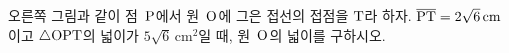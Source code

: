 \noindent\begin{minipage}[t]{0.58\linewidth}\vspace{0pt}\raggedright 오른쪽 그림과 같이 점~$\mathrm{P}$에서 원~$\mathrm{O}$에 그은 접선의 접점을 $\mathrm{T}$라 하자. $\overline{\mathrm{PT}}=2\sqrt{6}\,\mathrm{cm}$이고 $\triangle\mathrm{OPT}$의 넓이가 $5\sqrt{6}\,\mathrm{cm}^2$일 때, 원~$\mathrm{O}$의 넓이를 구하시오.\end{minipage}\hfill\begin{minipage}[t]{0.4\linewidth}\vspace{0pt}\centering \resizebox{\ifdim\width>\linewidth\linewidth\else\width\fi}{!}{}\end{minipage}\par
